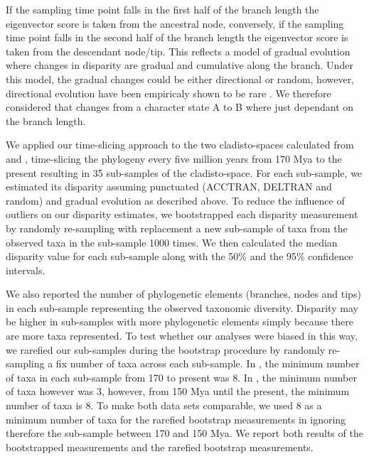 \documentclass[12pt,letterpaper]{article}
\begin{document}
\begin{enumerate}
    If the sampling time point falls in the first half of the branch length the eigenvector score is taken from the ancestral node, conversely, if the sampling time point falls in the second half of the branch length the eigenvector score is taken from the descendant node/tip.
    This reflects a model of gradual evolution where changes in disparity are gradual and cumulative along the branch.
    Under this model, the gradual changes could be either directional or random, however, directional evolution have been empiricaly shown to be rare \citep[only 5\% of the time][]{Hunt20112007}.
    We therefore considered that changes from a character state A to B where just dependant on the branch length.
\end{enumerate}
We applied our time-slicing approach to the two cladisto-spaces calculated from \cite{Slater2012MEE} and \cite{beckancient2014}, time-slicing the phylogeny every five million years from 170 Mya to the present resulting in 35 sub-samples of the cladisto-space.
For each sub-sample, we estimated its disparity assuming punctuated (ACCTRAN, DELTRAN and random) and gradual evolution as described above.
To reduce the influence of outliers on our disparity estimates, we bootstrapped each disparity measurement by randomly re-sampling with replacement a new sub-sample of taxa from the observed taxa in the sub-sample 1000 times.
We then calculated the median disparity value for each sub-sample along with the 50\% and the 95\% confidence intervals.

We also reported the number of phylogenetic elements (branches, nodes and tips) in each sub-sample representing the observed taxonomic diversity.
Disparity may be higher in sub-samples with more phylogenetic elements simply because there are more taxa represented.
To test whether our analyses were biased in this way, we rarefied our sub-samples during the bootstrap procedure by randomly re-sampling a fix number of taxa across each sub-sample.
In \cite{Slater2012MEE}, the minimum number of taxa in each sub-sample from 170 to present was 8.
In \cite{beckancient2014}, the minimum number of taxa however was 3, however, from 150 Mya until the present, the minimum number of taxa is 8.
To make both data sets comparable, we used 8 as a minimum number of taxa for the rarefied bootstrap measurements in \cite{beckancient2014} ignoring therefore the sub-sample between 170 and 150 Mya.
We report both results of the bootstrapped measurements and the rarefied bootstrap measurements.
\end{document}

